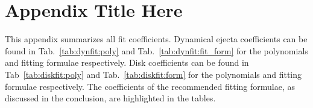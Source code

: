 
\chapter{Appendix Title Here} %

\label{app:fit} %

This appendix summarizes all fit coefficients.
Dynamical ejecta coefficients can be found in 
Tab.~\ref{tab:dynfit:poly} and 
Tab.~\ref{tab:dynfit:fit_form} for the polynomials and fitting
formulae respectively.
Disk coefficients can be found in 
Tab~\ref{tab:diskfit:poly} and 
Tab.~\ref{tab:diskfit:form} for the polynomials and fitting
formulae respectively.
The coefficients of the recommended fitting formulae, as discussed in
the conclusion, are highlighted in the tables.

  
